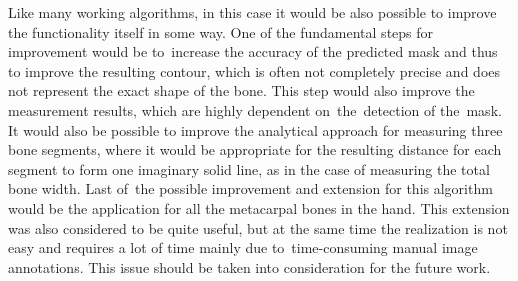 Like many working algorithms, in this case it would be also possible to improve the functionality itself in some way. One of the fundamental steps for improvement would be to~increase the accuracy of the predicted mask and thus to improve the resulting contour, which is often not completely precise and does not represent the exact shape of the bone. This step would also improve the measurement results, which are highly dependent on~the~detection of the~mask. It would also be possible to improve the analytical approach for measuring three bone segments, where it would be appropriate for the resulting distance for each segment to form one imaginary solid line, as in the case of measuring the total bone width. Last of~the possible improvement and extension for this algorithm would be the application for all the metacarpal bones in the hand. This extension was also considered to be quite useful, but at the same time the realization is not easy and requires a lot of time mainly due to~time-consuming manual image annotations. This issue should be taken into consideration for the future work.

